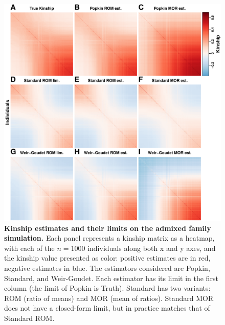 \documentclass[11pt]{article}
\begin{document}
\begin{figure}[bp!]
  \centering
  \includegraphics[height=0.8\textheight]{kinship.pdf}
  \caption{
    {\bf Kinship estimates and their limits on the admixed family simulation.}
    Each panel represents a kinship matrix as a heatmap, with each of the $n=1000$ individuals along both x and y axes, and the kinship value presented as color: positive estimates are in red, negative estimates in blue.
    The estimators considered are Popkin, Standard, and Weir-Goudet.
    Each estimator has its limit in the first column (the limit of Popkin is Truth).
    Standard has two variants: ROM (ratio of means) and MOR (mean of ratios).
    Standard MOR does not have a closed-form limit, but in practice matches that of Standard ROM.
  }
  \label{fig:kinship_real}
\end{figure}
\end{document}
